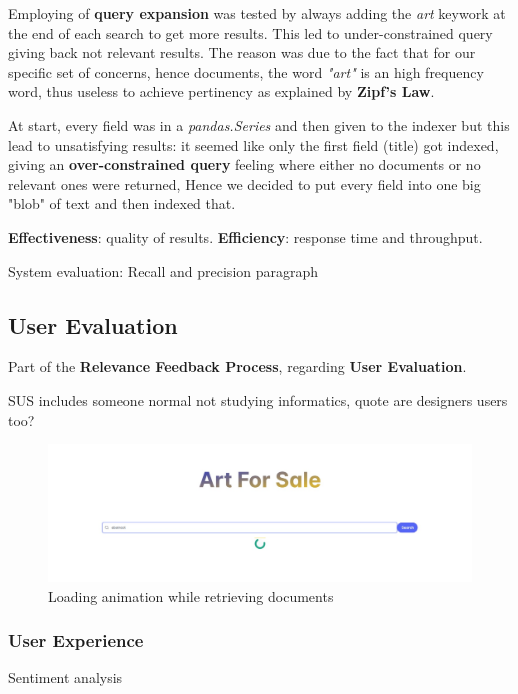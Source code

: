 \documentclass[12pt]{spieman}  %
\begin{document}
\begin{spacing}{1}
    Employing of \textbf{query expansion} was tested by always adding the \textit{art} keywork
    at the end of each search to get more results.
    This led to under-constrained query giving back not relevant results.
    The reason was due to the fact that for our specific set of concerns, hence documents, the word
    \textit{"art"} is an high frequency word, thus useless to achieve pertinency as explained by
    \textbf{Zipf's Law}.

    At start, every field was in a \textit{pandas.Series} and then given to the indexer but this lead to
    unsatisfying results: it seemed like only the first field (title) got indexed,
    giving an \textbf{over-constrained query} feeling where either no documents or no relevant ones were returned,
    Hence we decided to put every field into one big "blob" of text and then indexed that.

    \textbf{Effectiveness}: quality of results. \textbf{Efficiency}: response time and throughput.

    System evaluation: Recall and precision paragraph

    \subsection{User Evaluation}
    Part of the \textbf{Relevance Feedback Process}, regarding \textbf{User Evaluation}.

    SUS includes someone normal not studying informatics, quote are designers users too?

    \begin{figure}[H]
        \centering
        \caption{Loading animation while retrieving documents}
        \label{fig:carousel}
        \includegraphics[width=\textwidth, trim={7cm 0cm 7cm 0cm}, clip]{figures/loading.jpeg}
    \end{figure}

    \subsubsection{User Experience}\label{sec:ux}
    Sentiment analysis



\end{spacing}
\end{document}
